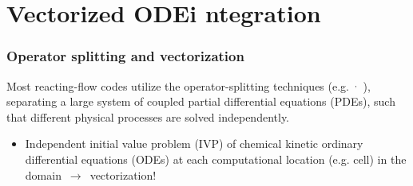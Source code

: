 \documentclass{beamer}
\newenvironment{background}{%
\usebackgroundtemplate{%
\rule{0pt}{\paperheight}%
\hspace*{\paperwidth}%
\makebox[0pt][r]{\texttt{[image: logo]}}%
}}{}
\begin{document}
\begin{background}
 \section{Vectorized ODEi ntegration}

\begin{frame}
 \frametitle{Operator splitting and vectorization}
 Most reacting-flow codes utilize the operator-splitting techniques (e.g.~$^{,}$~), separating a large system of coupled partial differential equations (PDEs), such that different physical processes are solved independently.
 \begin{itemize}
  \item Independent initial value problem (IVP) of chemical kinetic ordinary differential equations (ODEs) at each computational location (e.g. cell) in the domain~$\rightarrow$~vectorization!
 \end{itemize}
\end{frame}

\end{background}
\end{document}
